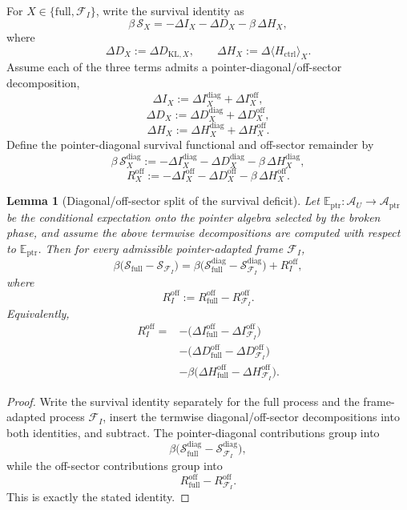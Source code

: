 \documentclass[12pt]{article}
\newtheorem{lemma}[theorem]{Lemma}
\theoremstyle{definition}
\theoremstyle{remark}
\begin{document}
For \(X\in\{\mathrm{full},\mathcal F_I\}\), write the survival identity
as
\[
\beta\,\mathcal S_X
=
-\Delta I_X
-\Delta D_X
-\beta\,\Delta H_X,
\]
where
\[
\Delta D_X:=\Delta D_{\mathrm{KL},X},
\qquad
\Delta H_X:=\Delta\langle H_{\mathrm{ctrl}}\rangle_X.
\]
Assume each of the three terms admits a pointer-diagonal/off-sector
decomposition,
\[
\Delta I_X
:=
\Delta I_X^{\mathrm{diag}}
+
\Delta I_X^{\mathrm{off}},
\]
\[
\Delta D_X
:=
\Delta D_X^{\mathrm{diag}}
+
\Delta D_X^{\mathrm{off}},
\]
\[
\Delta H_X
:=
\Delta H_X^{\mathrm{diag}}
+
\Delta H_X^{\mathrm{off}}.
\]
Define the pointer-diagonal survival functional and off-sector remainder
by
\[
\beta\,\mathcal S_X^{\mathrm{diag}}
:=
-\Delta I_X^{\mathrm{diag}}
-\Delta D_X^{\mathrm{diag}}
-\beta\,\Delta H_X^{\mathrm{diag}},
\]
\[
R_X^{\mathrm{off}}
:=
-\Delta I_X^{\mathrm{off}}
-\Delta D_X^{\mathrm{off}}
-\beta\,\Delta H_X^{\mathrm{off}}.
\]

\begin{lemma}[Diagonal/off-sector split of the survival deficit]\label{lem:diag_off_split}
Let \(\mathbb E_{\mathrm{ptr}}:\mathcal A_U\to \mathcal A_{\mathrm{ptr}}\)
be the conditional expectation onto the pointer algebra selected by the
broken phase, and assume the above termwise decompositions are computed
with respect to \(\mathbb E_{\mathrm{ptr}}\). Then for every admissible
pointer-adapted frame \(\mathcal F_I\),
\[
\beta\bigl(
\mathcal S_{\mathrm{full}}
-
\mathcal S_{\mathcal F_I}
\bigr)
=
\beta\bigl(
\mathcal S_{\mathrm{full}}^{\mathrm{diag}}
-
\mathcal S_{\mathcal F_I}^{\mathrm{diag}}
\bigr)
+
R_I^{\mathrm{off}},
\]
where
\[
R_I^{\mathrm{off}}
:=
R_{\mathrm{full}}^{\mathrm{off}}
-
R_{\mathcal F_I}^{\mathrm{off}}.
\]
Equivalently,
\begin{align*}
R_I^{\mathrm{off}}
=&
-\bigl(
\Delta I_{\mathrm{full}}^{\mathrm{off}}
-
\Delta I_{\mathcal F_I}^{\mathrm{off}}
\bigr) \\
&
-\bigl(
\Delta D_{\mathrm{full}}^{\mathrm{off}}
-
\Delta D_{\mathcal F_I}^{\mathrm{off}}
\bigr) \\
&
-\beta\bigl(
\Delta H_{\mathrm{full}}^{\mathrm{off}}
-
\Delta H_{\mathcal F_I}^{\mathrm{off}}
\bigr).
\end{align*}
\end{lemma}

\begin{proof}
Write the survival identity separately for the full process and the
frame-adapted process \(\mathcal F_I\), insert the termwise
diagonal/off-sector decompositions into both identities, and subtract.
The pointer-diagonal contributions group into
\[
\beta\bigl(
\mathcal S_{\mathrm{full}}^{\mathrm{diag}}
-
\mathcal S_{\mathcal F_I}^{\mathrm{diag}}
\bigr),
\]
while the off-sector contributions group into
\[
R_{\mathrm{full}}^{\mathrm{off}}
-
R_{\mathcal F_I}^{\mathrm{off}}.
\]
This is exactly the stated identity.
\end{proof}
\end{document}
